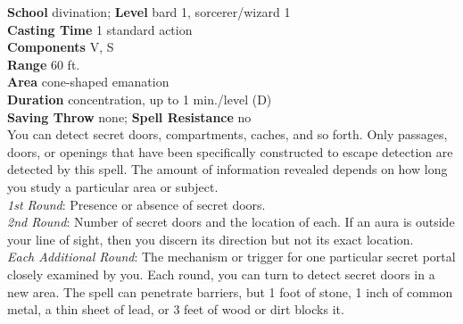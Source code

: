 \textbf{School} divination; \textbf{Level} bard 1, sorcerer/wizard 1\\
\textbf{Casting Time} 1 standard action\\
\textbf{Components} V, S\\
\textbf{Range} 60 ft.\\
\textbf{Area} cone-shaped emanation\\
\textbf{Duration} concentration, up to 1 min./level (D)\\
\textbf{Saving Throw} none; \textbf{Spell Resistance} no\\
You can detect secret doors, compartments, caches, and so forth. Only passages, doors, or openings that have been specifically constructed to escape detection are detected by this spell. The amount of information revealed depends on how long you study a particular area or subject.\\
\textit{1st Round}: Presence or absence of secret doors.\\
\textit{2nd Round}: Number of secret doors and the location of each. If an aura is outside your line of sight, then you discern its direction but not its exact location.\\
\textit{Each Additional Round}: The mechanism or trigger for one particular secret portal closely examined by you. Each round, you can turn to detect secret doors in a new area. The spell can penetrate barriers, but 1 foot of stone, 1 inch of common metal, a thin sheet of lead, or 3 feet of wood or dirt blocks it.\\
